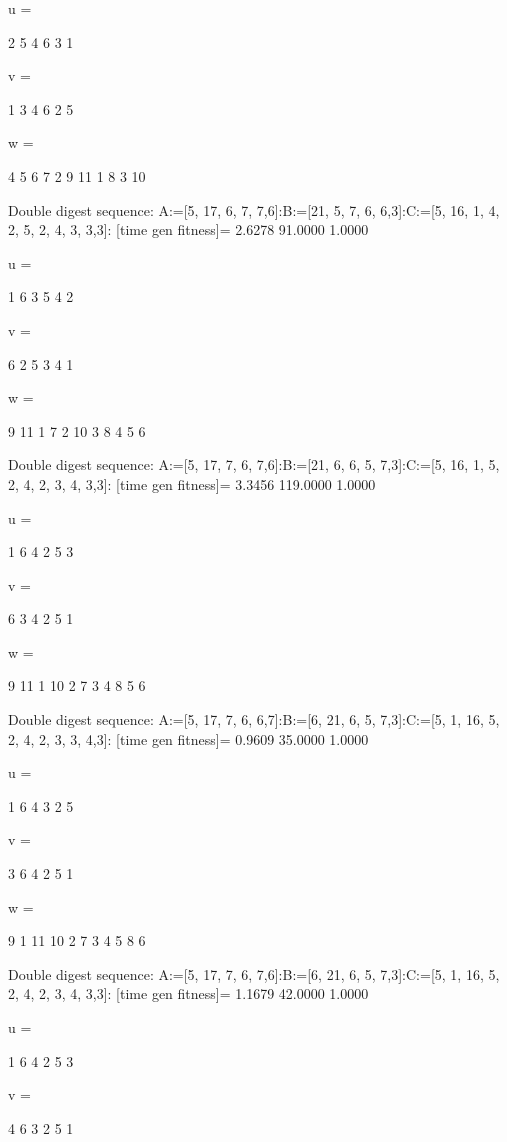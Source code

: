 u =

     2     5     4     6     3     1


v =

     1     3     4     6     2     5


w =

     4     5     6     7     2     9    11     1     8     3    10

Double digest sequence:
A:=[5, 17, 6, 7, 7,6]:B:=[21, 5, 7, 6, 6,3]:C:=[5, 16, 1, 4, 2, 5, 2, 4, 3, 3,3]:
[time gen fitness]=
    2.6278   91.0000    1.0000


u =

     1     6     3     5     4     2


v =

     6     2     5     3     4     1


w =

     9    11     1     7     2    10     3     8     4     5     6

Double digest sequence:
A:=[5, 17, 7, 6, 7,6]:B:=[21, 6, 6, 5, 7,3]:C:=[5, 16, 1, 5, 2, 4, 2, 3, 4, 3,3]:
[time gen fitness]=
    3.3456  119.0000    1.0000


u =

     1     6     4     2     5     3


v =

     6     3     4     2     5     1


w =

     9    11     1    10     2     7     3     4     8     5     6

Double digest sequence:
A:=[5, 17, 7, 6, 6,7]:B:=[6, 21, 6, 5, 7,3]:C:=[5, 1, 16, 5, 2, 4, 2, 3, 3, 4,3]:
[time gen fitness]=
    0.9609   35.0000    1.0000


u =

     1     6     4     3     2     5


v =

     3     6     4     2     5     1


w =

     9     1    11    10     2     7     3     4     5     8     6

Double digest sequence:
A:=[5, 17, 7, 6, 7,6]:B:=[6, 21, 6, 5, 7,3]:C:=[5, 1, 16, 5, 2, 4, 2, 3, 4, 3,3]:
[time gen fitness]=
    1.1679   42.0000    1.0000


u =

     1     6     4     2     5     3


v =

     4     6     3     2     5     1


